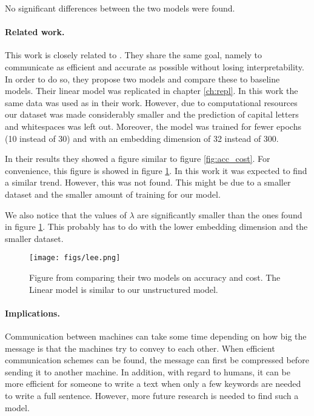 No significant differences between the two models were found.

\paragraph{Related work.}
This work is closely related to . 
They share the same goal, namely to communicate as efficient and accurate as possible without losing interpretability. 
In order to do so, they propose two models and compare these to baseline models. 
Their linear model was replicated in chapter \ref{ch:repl}. 
In this work the same data was used as in their work.
However, due to computational resources our dataset was made considerably smaller and the prediction of capital letters and whitespaces was left out.
Moreover, the model was trained for fewer epochs (10 instead of 30) and with an embedding dimension of 32 instead of 300.

In their results they showed a figure similar to figure \ref{fig:acc_cost}.
For convenience, this figure is showed in figure \ref{fig:lee}.
In this work it was expected to find a similar trend. 
However, this was not found. 
This might be due to a smaller dataset and the smaller amount of training for our model.

We also notice that the values of $\lambda$ are significantly smaller than the ones found in figure \ref{fig:lee}.
This probably has to do with the lower embedding dimension and the smaller dataset.

\begin{figure}
    \centering
    \texttt{[image: figs/lee.png]}
    \caption{Figure from \protect{} comparing their two models on accuracy and cost. The Linear model is similar to our unstructured model.}
    \label{fig:lee}
\end{figure}

\paragraph{Implications.}
Communication between machines can take some time depending on how big the message is that the machines try to convey to each other.
When efficient communication schemes can be found, the message can first be compressed before sending it to another machine. 
In addition, with regard to humans, it can be more efficient for someone to write a text when only a few keywords are needed to write a full sentence. 
However, more future research is needed to find such a model.

